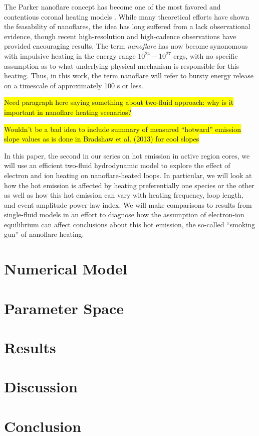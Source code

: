 \documentclass[iop]{emulateapj}
\begin{document}
	\par The Parker nanoflare concept has become one of the most favored and contentious coronal heating models \citep{cargill_implications_1994,cargill_nanoflare_2004,klimchuk_solving_2006}. While many theoretical efforts \citep[e.g.][]{bradshaw_diagnosing_2012,reep_diagnosing_2013} have shown the feasability of nanoflares, the idea has long suffered from a lack observational evidence, though recent high-resolution and high-cadence observations \citep{brosius_pervasive_2014,testa_observing_2013,testa_evidence_2014} have provided encouraging results. The term \textit{nanoflare} has now become synonomous with impulsive heating in the energy range $10^{24}-10^{27}$ ergs, with no specific assumption as to what underlying physical mechanism is responsible for this heating. Thus, in this work, the term nanoflare will refer to bursty energy release on a timescale of approximately 100 s or less.
	\par\hl{Need paragraph here saying something about two-fluid approach: why is it important in nanoflare heating scenarios?}
	\par\hl{Wouldn't be a bad idea to include summary of measured ``hotward'' emission slope values as is done in Bradshaw et al. (2013) for cool slopes}
	\par In this paper, the second in our series on hot emission in active region cores, we will use an efficient two-fluid hydrodynamic model to explore the effect of electron and ion heating on nanoflare-heated loops. In particular, we will look at how the hot emission is affected by heating preferentially one species or the other as well as how this hot emission can vary with heating frequency, loop length, and event amplitude power-law index. We will make comparisons to results from single-fluid models in an effort to diagnose how the assumption of electron-ion equilibrium can affect conclusions about this hot emission, the so-called ``smoking gun'' of nanoflare heating.
	\section{Numerical Model}
	\par 
	\section{Parameter Space}
	\section{Results}
	\section{Discussion}
	\section{Conclusion}
	
	
	
\end{document}
